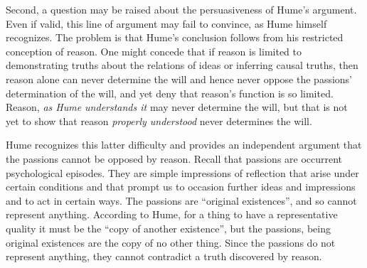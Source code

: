 Second, a question may be raised about the persuasiveness of Hume's argument. Even if valid, this line of argument may fail to convince, as Hume himself recognizes. The problem is that Hume's conclusion follows from his restricted conception of reason. One might concede that if reason is limited to demonstrating truths about the relations of ideas or inferring causal truths, then reason alone can never determine the will and hence never oppose the passions' determination of the will, and yet deny that reason's function is so limited. Reason, \emph{as Hume understands it} may never determine the will, but that is not yet to show that reason \emph{properly understood} never determines the will. \change

% 


Hume recognizes this latter difficulty and provides an independent argument that the passions cannot be opposed by reason. Recall that passions are occurrent psychological episodes. They are simple impressions of reflection that arise under certain conditions and that prompt us to occasion further ideas and impressions and to act in certain ways. The passions are ``original existences'', and so cannot represent anything. According to Hume, for a thing to have a representative quality it must be the ``copy of another existence'', but the passions, being original existences are the copy of no other thing. Since the passions do not represent anything, they cannot contradict a truth discovered by reason.

